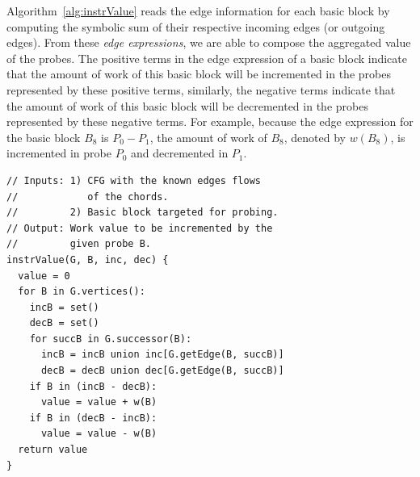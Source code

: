 \documentclass[sigplan,10pt]{acmart}
\begin{document}

Algorithm~\ref{alg:instrValue} reads the edge information for each basic block by computing the symbolic sum of their respective incoming edges (or outgoing edges).
From these \textit{edge expressions}, we are able to compose the aggregated value of the probes.
The positive terms in the edge expression of a basic block indicate that the amount of work of this basic block will be incremented in the probes represented by these positive terms, similarly, the negative terms indicate that the amount of work of this basic block will be decremented in the probes represented by these negative terms.
For example, because the edge expression for the basic block $B_8$ is $P_0 - P_1$, the amount of work of $B_8$, denoted by $w(B_8)$, is incremented in probe $P_0$ and decremented in $P_1$.

\begin{lstlisting}[caption={Pseudocode that describes how the edge information is used in order to extract the value that will be computed in a given instrumented basic block $B_I$. This algorithm could equally be implemented based on the predecessors.}, label={lst:instrValue}, float]
// Inputs: 1) CFG with the known edges flows
//            of the chords.
//         2) Basic block targeted for probing.
// Output: Work value to be incremented by the
//         given probe B.
instrValue(G, B, inc, dec) {
  value = 0
  for B in G.vertices():
    incB = set()
    decB = set()
    for succB in G.successor(B):
      incB = incB union inc[G.getEdge(B, succB)]
      decB = decB union dec[G.getEdge(B, succB)]
    if B in (incB - decB):
      value = value + w(B)
    if B in (decB - incB):
      value = value - w(B)
  return value
}
\end{lstlisting}
\end{document}
